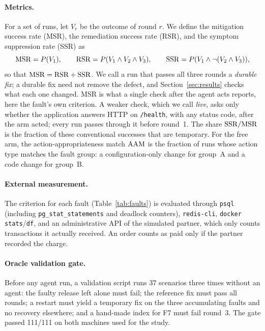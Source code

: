 \paragraph{Metrics.} For a set of runs, let $V_r$ be the outcome of round $r$. We define the mitigation success rate
(MSR), the remediation success rate (RSR), and the symptom suppression rate (SSR) as
\[
\mathrm{MSR} = P(V_1), \qquad \mathrm{RSR} = P(V_1 \wedge V_2 \wedge V_3), \qquad \mathrm{SSR} = P(V_1 \wedge \neg(V_2 \wedge V_3)),
\]
so that $\mathrm{MSR} = \mathrm{RSR} + \mathrm{SSR}$. We call a run that passes all three rounds a \emph{durable fix}; a durable fix need not
remove the defect, and Section~\ref{sec:results} checks what each one changed. MSR is what a single check after the
agent acts reports, here the fault's own criterion. A weaker check, which we call \emph{live}, asks only whether the
application answers HTTP on \texttt{/health}, with any status code, after the arm acted; every run passes through it before round~1. The share $\mathrm{SSR}/\mathrm{MSR}$ is the
fraction of these conventional successes that are temporary. For the free arm, the action-appropriateness match $\mathrm{AAM}$ is the fraction of
runs whose action type matches the
fault group: a configuration-only change for group~A and a code change for group~B.

\paragraph{External measurement.} The criterion for each fault (Table~\ref{tab:faults}) is evaluated through
\texttt{psql} (including \texttt{pg\_stat\_statements} and deadlock counters), \texttt{redis-cli}, \texttt{docker
stats}/\texttt{df}, and an administrative API of the simulated partner, which only counts transactions it actually
received. An order counts as paid only if the partner recorded the charge.

\paragraph{Oracle validation gate.} Before any agent run, a validation script runs 37 scenarios three times without an
agent: the faulty release left alone must fail; the reference fix must pass all rounds; a restart must yield a temporary
fix on the three accumulating faults and no recovery elsewhere; and a hand-made index for F7 must fail round~3. The gate
passed 111/111 on both machines used for the study.

